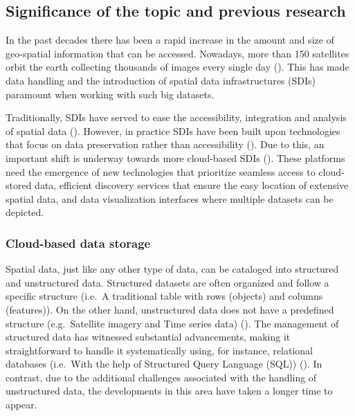 \documentclass[
  oneside,
  open=any]{scrbook}
\begin{document}
\subsection{Significance of the topic and previous
research}\label{significance-of-the-topic-and-previous-research}

In the past decades there has been a rapid increase in the amount and
size of geo-spatial information that can be accessed. Nowadays, more
than 150 satellites orbit the earth collecting thousands of images every
single day (). This
has made data handling and the introduction of spatial data
infrastructures (SDIs) paramount when working with such big datasets.

Traditionally, SDIs have served to ease the accessibility, integration
and analysis of spatial data
(). However, in practice SDIs have been built upon technologies that
focus on data preservation rather than accessibility
(). Due to this,
an important shift is underway towards more cloud-based SDIs
(). These
platforms need the emergence of new technologies that prioritize
seamless access to cloud-stored data, efficient discovery services that
ensure the easy location of extensive spatial data, and data
visualization interfaces where multiple datasets can be depicted.

\subsubsection*{Cloud-based data
storage}\label{cloud-based-data-storage}

Spatial data, just like any other type of data, can be cataloged into
structured and unstructured data. Structured datasets are often
organized and follow a specific structure (i.e.~A traditional table with
rows (objects) and columns (features)). On the other hand, unstructured
data does not have a predefined structure (e.g.~Satellite imagery and
Time series data) (). The management of structured data has witnessed
substantial advancements, making it straightforward to handle it
systematically using, for instance, relational databases (i.e.~With the
help of Structured Query Language (SQL))
(). In
contrast, due to the additional challenges associated with the handling
of unstructured data, the developments in this area have taken a longer
time to appear.
\end{document}
